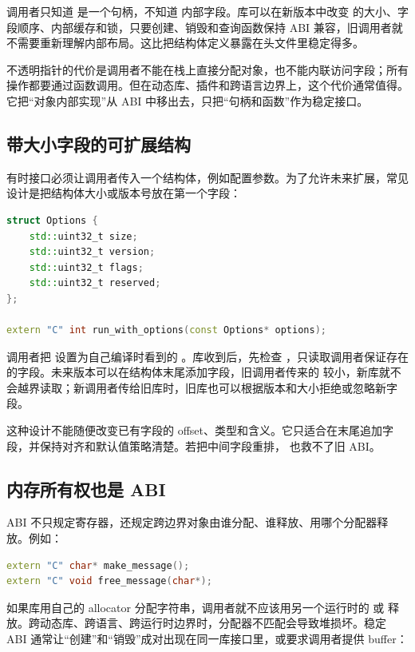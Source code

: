 调用者只知道  是一个句柄，不知道  内部字段。库可以在新版本中改变  的大小、字段顺序、内部缓存和锁，只要创建、销毁和查询函数保持 ABI 兼容，旧调用者就不需要重新理解内部布局。这比把结构体定义暴露在头文件里稳定得多。

不透明指针的代价是调用者不能在栈上直接分配对象，也不能内联访问字段；所有操作都要通过函数调用。但在动态库、插件和跨语言边界上，这个代价通常值得。它把“对象内部实现”从 ABI 中移出去，只把“句柄和函数”作为稳定接口。

\subsection{带大小字段的可扩展结构}

有时接口必须让调用者传入一个结构体，例如配置参数。为了允许未来扩展，常见设计是把结构体大小或版本号放在第一个字段：

\begin{lstlisting}[language=C++]
struct Options {
    std::uint32_t size;
    std::uint32_t version;
    std::uint32_t flags;
    std::uint32_t reserved;
};

extern "C" int run_with_options(const Options* options);
\end{lstlisting}

调用者把  设置为自己编译时看到的 。库收到后，先检查 ，只读取调用者保证存在的字段。未来版本可以在结构体末尾添加字段，旧调用者传来的  较小，新库就不会越界读取；新调用者传给旧库时，旧库也可以根据版本和大小拒绝或忽略新字段。

这种设计不能随便改变已有字段的 offset、类型和含义。它只适合在末尾追加字段，并保持对齐和默认值策略清楚。若把中间字段重排， 也救不了旧 ABI。

\subsection{内存所有权也是 ABI}

ABI 不只规定寄存器，还规定跨边界对象由谁分配、谁释放、用哪个分配器释放。例如：

\begin{lstlisting}[language=C++]
extern "C" char* make_message();
extern "C" void free_message(char*);
\end{lstlisting}

如果库用自己的 allocator 分配字符串，调用者就不应该用另一个运行时的  或  释放。跨动态库、跨语言、跨运行时边界时，分配器不匹配会导致堆损坏。稳定 ABI 通常让“创建”和“销毁”成对出现在同一库接口里，或要求调用者提供 buffer：

